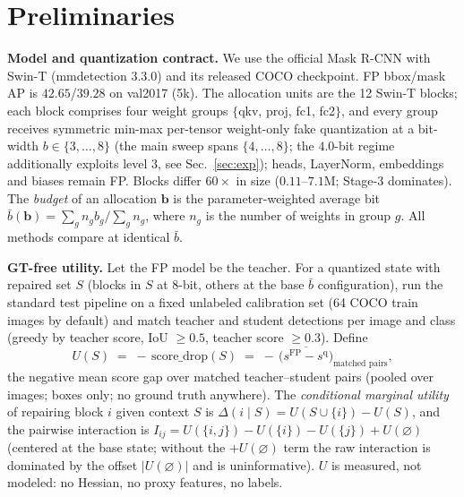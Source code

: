 \section{Preliminaries}
\label{sec:prelim}

\noindent\textbf{Model and quantization contract.}
We use the official Mask R-CNN with Swin-T (mmdetection 3.3.0) and its
released COCO checkpoint. FP bbox/mask AP is $42.65$/$39.28$ on val2017
(5k). The allocation units are the 12 Swin-T blocks; each block comprises
four weight groups $\{$qkv, proj, fc1, fc2$\}$, and every group receives
symmetric min-max per-tensor weight-only fake quantization at a bit-width
$b\in\{3,\ldots,8\}$ (the main sweep spans $\{4,\ldots,8\}$; the
$4.0$-bit regime additionally exploits level $3$, see
Sec.~\ref{sec:exp}); heads, LayerNorm, embeddings and biases remain FP.
Blocks differ $60\times$ in size ($0.11$--$7.1$M; Stage-3 dominates). The \emph{budget} of an allocation $\mathbf{b}$ is
the parameter-weighted average bit
$\bar{b}(\mathbf{b})=\sum_g n_g b_g / \sum_g n_g$, where $n_g$ is the
number of weights in group $g$. All methods compare at identical
$\bar{b}$.

\smallskip
\noindent\textbf{GT-free utility.}
Let the FP model be the teacher. For a quantized state with repaired set
$S$ (blocks in $S$ at 8-bit, others at the base $\bar{b}$ configuration),
run the standard test pipeline on a fixed unlabeled calibration set (64
COCO train images by default) and match teacher and student detections
per image and class (greedy by teacher score, IoU $\geq 0.5$, teacher
score $\geq 0.3$). Define
\begin{equation}
U(S) \;=\; -\,\mathrm{score\_drop}(S)
\;=\;-\,\overline{\big(s^{\mathrm{FP}} - s^{\mathrm{q}}\big)}_{\text{matched pairs}},
\label{eq:utility}
\end{equation}
the negative mean score gap over matched teacher--student pairs (pooled
over images; boxes only; no ground truth anywhere). The
\emph{conditional marginal utility} of repairing block $i$ given context
$S$ is
$\Delta(i\mid S) = U(S\cup\{i\}) - U(S)$,
and the pairwise interaction is
$I_{ij} = U(\{i,j\}) - U(\{i\}) - U(\{j\}) + U(\varnothing)$
(centered at the base state; without the $+U(\varnothing)$ term the raw
interaction is dominated by the offset $|U(\varnothing)|$ and is
uninformative).
$U$ is measured, not modeled: no Hessian, no proxy features, no labels.

